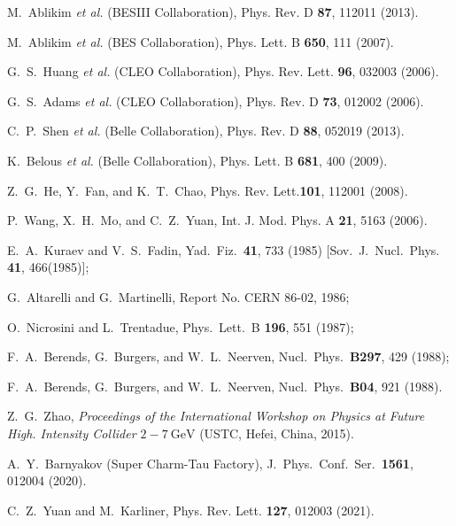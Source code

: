 \documentclass[%
preprint,
 amsmath,amssymb,
 aps,
]{revtex4-2}
\newcommand{\gev}{\mathrm{GeV}}
\begin{document}
\begin{thebibliography}{**}
M.~Ablikim \textit{et al.} (BESIII Collaboration),
Phys. Rev. D \textbf{87}, 112011 (2013).

M.~Ablikim \textit{et al.} (BES Collaboration),
Phys. Lett. B \textbf{650}, 111 (2007).

G.~S.~Huang \textit{et al.} (CLEO Collaboration),
Phys. Rev. Lett. \textbf{96}, 032003 (2006).

G.~S.~Adams \textit{et al.} (CLEO Collaboration),
Phys. Rev. D \textbf{73}, 012002 (2006).

C.~P.~Shen \textit{et al.} (Belle Collaboration),
Phys. Rev. D \textbf{88}, 052019 (2013).

K.~Belous \textit{et al.} (Belle Collaboration),
Phys. Lett. B \textbf{681}, 400 (2009).

Z.~G.~He, Y.~Fan, and K.~T.~Chao,
Phys. Rev. Lett.\textbf{101}, 112001 (2008).


P.~Wang, X.~H.~Mo, and C.~Z.~Yuan,
Int. J. Mod. Phys. A \textbf{21}, 5163 (2006).

E.~A.~Kuraev and V.~S.~Fadin, 
Yad.\ Fiz.\ {\bf 41}, 733 (1985) [Sov.\ J.\ Nucl.\ Phys. {\bf 41}, 466(1985)];

G.~Altarelli and G.~Martinelli, Report No. CERN 86-02, 1986;

O.~Nicrosini and L.~Trentadue, 
Phys.\ Lett.\ B {\bf 196}, 551 (1987);

F.~A.~Berends, G.~Burgers, and W.~L.~Neerven, 
Nucl.\ Phys.\ {\bf B297}, 429 (1988);

F.~A.~Berends, G.~Burgers, and W.~L.~Neerven, 
Nucl.\ Phys.\ {\bf B04}, 921 (1988).


Z.~G.~Zhao, 
{\it Proceedings of the International Workshop on Physics at Future High. Intensity Collider $2-7~\gev$ }
(USTC, Hefei, China, 2015).

A.~Y.~Barnyakov (Super Charm-Tau Factory), 
J.\ Phys.\ Conf.\ Ser.\  {\bf1561}, 012004 (2020).

C.~Z.~Yuan and M.~Karliner,
Phys. Rev. Lett. \textbf{127}, 012003 (2021).

 
\end{thebibliography}

%
\end{document}

